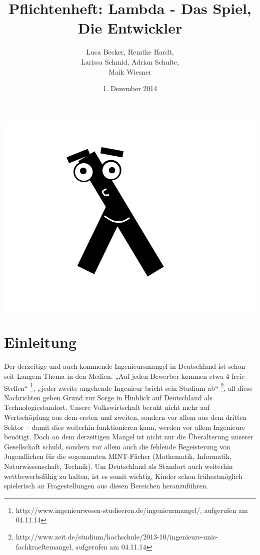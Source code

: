 \documentclass{scrartcl}
\begin{document}
\title{Pflichtenheft: Lambda - Das Spiel, \\ Die Entwickler}
\author{Luca Becker, Henrike Hardt,\\Larissa Schmid, Adrian Schulte,\\Maik Wiesner}
\date{1. Dezember 2014}
\maketitle
\includegraphics[width=\textwidth]{assets/Lambdolino}
\thispagestyle{empty}

\clearpage

\thispagestyle{empty}
\tableofcontents
\thispagestyle{empty}

\clearpage
\setcounter{page}{1}




    


\section{Einleitung}

Der derzeitige und auch kommende Ingenieursmangel in Deutschland ist
schon seit Langem Thema in den Medien. „Auf jeden Bewerber kommen
etwa 4 freie Stellen“%
\footnote{http://www.ingenieurwesen-studieeren.de/ingenieurmangel/, aufgerufen am 04.11.14%
}, „jeder zweite angehende Ingenieur bricht sein Studium ab“%
\footnote{http://www.zeit.de/studium/hochschule/2013-10/ingenieure-unis-fachkraeftemangel, aufgerufen am 04.11.14%
}, all diese Nachrichten geben Grund zur Sorge in Hinblick auf Deutschland
als Technologiestandort. Unsere Volkswirtschaft beruht nicht mehr
auf Wertschöpfung aus dem ersten und zweiten, sondern vor allem aus
dem dritten Sektor – damit dies weiterhin funktionieren kann, werden
vor allem Ingenieure benötigt. Doch an dem derzeitigen Mangel ist
nicht nur die Überalterung unserer Gesellschaft schuld, sondern vor
allem auch die fehlende Begeisterung von Jugendlichen für die sogenannten
MINT-Fächer (Mathematik, Informatik, Naturwissenschaft, Technik).
Um Deutschland als Standort auch weiterhin wettbewerbsfähig zu halten,
ist es somit wichtig, Kinder schon frühestmöglich spielerisch an Fragestellungen
aus diesen Bereichen heranzuführen. 
\end{document}
